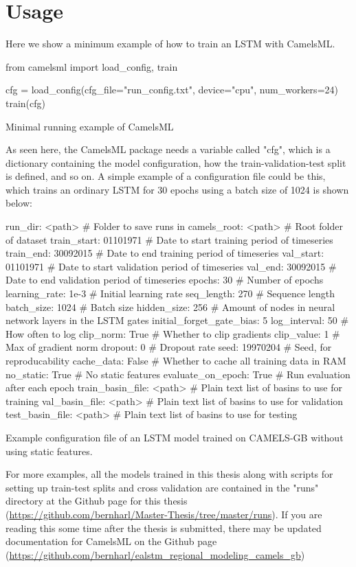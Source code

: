 \section{Usage}
Here we show a minimum example of how to train an LSTM with CamelsML. 
\begin{listing}
\begin{pythoncode}
from camelsml import load_config, train

cfg = load_config(cfg_file="run_config.txt", device="cpu", num_workers=24)
train(cfg)
\end{pythoncode}
    \caption[Minimal running example CamelsML.]{Minimal running example of CamelsML}
\end{listing}
As seen here, the CamelsML package needs a variable called "cfg", which is a dictionary 
containing the model configuration, how the train-validation-test split is defined, 
and so on. 
A simple example of a configuration file could be this, which trains an ordinary 
LSTM for 30 epochs using a batch size of 1024 is shown below:
\begin{listing}
\begin{cfgcode}
run_dir: <path> # Folder to save runs in
camels_root: <path> # Root folder of dataset
train_start: 01101971 # Date to start training period of timeseries
train_end: 30092015 # Date to end training period of timeseries
val_start: 01101971 # Date to start validation period of timeseries
val_end: 30092015 # Date to end validation period of timeseries
epochs: 30 # Number of epochs
learning_rate: 1e-3 # Initial learning rate
seq_length: 270 # Sequence length
batch_size: 1024 # Batch size
hidden_size:  256 # Amount of nodes in neural network layers in the LSTM gates
initial_forget_gate_bias: 5 
log_interval: 50 # How often to log
clip_norm: True # Whether to clip gradients
clip_value: 1 # Max of gradient norm
dropout: 0 # Dropout rate
seed: 19970204 # Seed, for reproducability 
cache_data: False # Whether to cache all training data in RAM
no_static: True # No static features
evaluate_on_epoch: True # Run evaluation after each epoch
train_basin_file: <path> # Plain text list of basins to use for training 
val_basin_file:  <path> # Plain text list of basins to use for validation
test_basin_file: <path> # Plain text list of basins to use for testing
\end{cfgcode}
    \caption[Example configuration file CamelsML.]{Example configuration file of an LSTM model trained on CAMELS-GB without using static features.}
\end{listing}
For more examples, all the models trained in this thesis along with scripts for 
setting up train-test splits and cross validation are contained in the "runs" directory at the 
Github page for this thesis (\url{https://github.com/bernharl/Master-Thesis/tree/master/runs}).
If you are reading this some time after the thesis is submitted, there may be updated 
documentation for CamelsML on the Github page (\url{https://github.com/bernharl/ealstm_regional_modeling_camels_gb})

